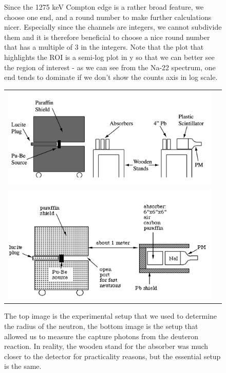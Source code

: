 \documentclass{article}
\begin{document}
\begin{figure}[!htb]
\begin{tabular}{c c}
    \end{tabular}
    \caption{Since the 1275 keV Compton edge is a rather broad feature, we choose one end, and a round number to make further calculations nicer.  Especially since the channels are integers, we cannot subdivide them and it is therefore beneficial to choose a nice round number that has a multiple of 3 in the integers.  Note that the plot that highlights the ROI is a semi-log plot in y so that we can better see the region of interest - as we can see from the Na-22 spectrum, one end tends to dominate if we don't show the counts axis in log scale.}
    \label{roi}
  \end{figure}

  \begin{figure}[!htb]
    \centering
    \begin{tabular}{c c}
      \includegraphics[scale=.25]{cross_section_apparatus.png} \\ \includegraphics[scale=.25]{day_1_apparatus.png} \\
    \end{tabular}
    \caption{The top image is the experimental setup that we used to determine the radius of the neutron, the bottom image is the setup that allowed us to measure the capture photons from the deuteron reaction.  In reality, the wooden stand for the absorber was much closer to the detector for practicality reasons, but the essential setup is the same.}
    \label{apparatus}
  \end{figure}
\end{document}
